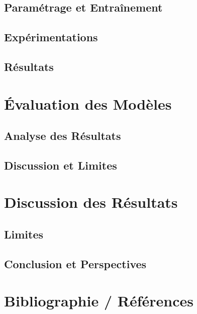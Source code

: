 \documentclass{rapport}
\begin{document}
\subsection{Paramétrage et Entraînement}
\subsection{Expérimentations}
\subsection{Résultats}

\section{Évaluation des Modèles}
\subsection{Analyse des Résultats}
\subsection{Discussion et Limites}

\section{Discussion des Résultats}
\subsection{Limites}
\subsection{Conclusion et Perspectives}

\section{Bibliographie / Références}



\end{document}
